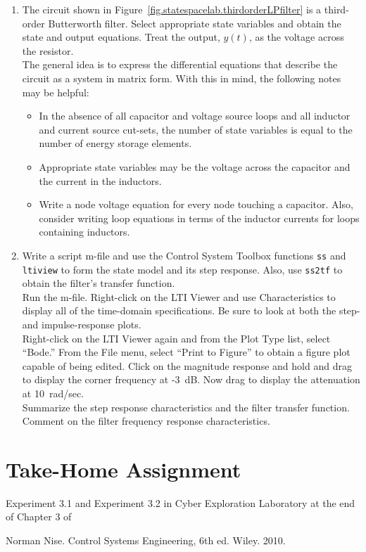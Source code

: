\begin{enumerate}
\item The circuit shown in Figure~\ref{fig.statespacelab.thirdorderLPfilter}
    is a third-order Butterworth filter.  Select appropriate state variables and obtain the state and output equations.  Treat the output, $y(t)$, as the voltage across the resistor.\\
    The general idea is to express the differential equations that describe the circuit as a system in matrix form.  With this in mind, the following notes may be helpful:
        \begin{itemize}
        \item In the absence of all capacitor and voltage source loops and all
            inductor and current source cut-sets, the number of state variables is equal to the number of energy storage elements.
        \item Appropriate state variables may be the voltage across the
            capacitor and the current in the inductors.
        \item Write a node voltage equation for every node touching a
            capacitor.  Also, consider writing loop equations in terms of the inductor currents for loops containing inductors.
        \end{itemize}
\item Write a script m-file and use the Control System Toolbox functions
    \verb=ss= and \verb=ltiview= to form the state model and its step response.  Also, use \verb=ss2tf= to obtain the filter's transfer function.\\
    Run the m-file.  Right-click on the LTI Viewer and use Characteristics to display all of the time-domain specifications.  Be sure to look at both the step- and impulse-response plots.  \\
    Right-click on the LTI Viewer again and from the Plot Type list, select ``Bode.''  From the File menu, select ``Print to Figure'' to obtain a figure plot capable of being edited.  Click on the magnitude response and hold and drag to display the corner frequency at -3~dB.  Now drag to display the attenuation at 10~rad/sec.\\
    Summarize the step response characteristics and the filter transfer function.  Comment on the filter frequency response characteristics.
\end{enumerate}

\section{Take-Home Assignment}
Experiment 3.1 and Experiment 3.2 in Cyber Exploration Laboratory at the end of Chapter 3 of \cite{nise}

\begin{thebibliography}{9}
     Norman Nise.  Control Systems Engineering, 6th ed.  Wiley.  2010.
\end{thebibliography}


